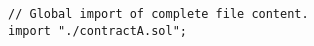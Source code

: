 \begin{lstlisting}[language=Solidity]
// Global import of complete file content.
import "./contractA.sol"; 
\end{lstlisting}